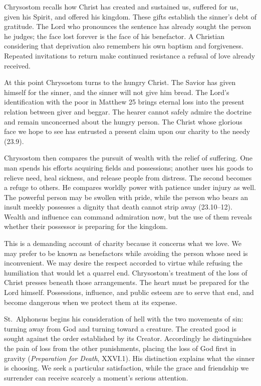 Chrysostom recalls how Christ has created and sustained us, suffered for us, given his Spirit, and offered his kingdom. These gifts establish the sinner's debt of gratitude. The Lord who pronounces the sentence has already sought the person he judges; the face lost forever is the face of his benefactor. A Christian considering that deprivation also remembers his own baptism and forgiveness. Repeated invitations to return make continued resistance a refusal of love already received.

At this point Chrysostom turns to the hungry Christ. The Savior has given himself for the sinner, and the sinner will not give him bread. The Lord's identification with the poor in Matthew 25 brings eternal loss into the present relation between giver and beggar. The hearer cannot safely admire the doctrine and remain unconcerned about the hungry person. The Christ whose glorious face we hope to see has entrusted a present claim upon our charity to the needy (23.9).

Chrysostom then compares the pursuit of wealth with the relief of suffering. One man spends his efforts acquiring fields and possessions; another uses his goods to relieve need, heal sickness, and release people from distress. The second becomes a refuge to others. He compares worldly power with patience under injury as well. The powerful person may be swollen with pride, while the person who bears an insult meekly possesses a dignity that death cannot strip away (23.10--12). Wealth and influence can command admiration now, but the use of them reveals whether their possessor is preparing for the kingdom.

This is a demanding account of charity because it concerns what we love. We may prefer to be known as benefactors while avoiding the person whose need is inconvenient. We may desire the respect accorded to virtue while refusing the humiliation that would let a quarrel end. Chrysostom's treatment of the loss of Christ presses beneath those arrangements. The heart must be prepared for the Lord himself. Possessions, influence, and public esteem are to serve that end, and become dangerous when we protect them at its expense.

St.~Alphonsus begins his consideration of hell with the two movements of sin: turning away from God and turning toward a creature. The created good is sought against the order established by its Creator. Accordingly he distinguishes the pain of loss from the other punishments, placing the loss of God first in gravity (\emph{Preparation for Death}, XXVI.1). His distinction explains what the sinner is choosing. We seek a particular satisfaction, while the grace and friendship we surrender can receive scarcely a moment's serious attention.

